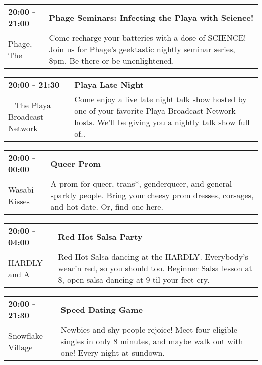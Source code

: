 \begin{tabular}{ p{1in} p{2.2in} }
    \textbf{20:00 - 21:00} & \textbf{Phage Seminars: Infecting the Playa with Science!} \\
    Phage, The \newline  & Come recharge your batteries with a dose of SCIENCE! Join us for Phage's geektastic nightly seminar series, 8pm. Be there or be unenlightened. \\
    \hline 
\end{tabular}
    
\begin{tabular}{ p{1in} p{2.2in} }
    \textbf{20:00 - 21:30} & \textbf{Playa Late Night} \\
    ~ \newline The Playa Broadcast Network & Come enjoy a live late night talk show hosted by one of your favorite Playa Broadcast Network hosts. We'll be giving you a nightly talk show full of.. \\
    \hline 
\end{tabular}
    
\begin{tabular}{ p{1in} p{2.2in} }
    \textbf{20:00 - 00:00} & \textbf{Queer Prom} \\
    Wasabi Kisses \newline  & A prom for queer, trans*, genderqueer, and general sparkly people. Bring your cheesy prom dresses, corsages, and hot date. Or, find one here. \\
    \hline 
\end{tabular}
    
\begin{tabular}{ p{1in} p{2.2in} }
    \textbf{20:00 - 04:00} & \textbf{Red Hot Salsa Party} \\
    HARDLY \newline 430 and A & Red Hot Salsa dancing at the HARDLY. Everybody's wear'n red, so you should too. Beginner Salsa lesson at 8, open salsa dancing at 9 til your feet cry. \\
    \hline 
\end{tabular}
    
\begin{tabular}{ p{1in} p{2.2in} }
    \textbf{20:00 - 21:30} & \textbf{Speed Dating Game} \\
    Snowflake Village \newline  & Newbies and shy people rejoice! Meet four eligible singles in only 8 minutes, and maybe walk out with one! Every night at sundown. \\
    \hline 
\end{tabular}
    
